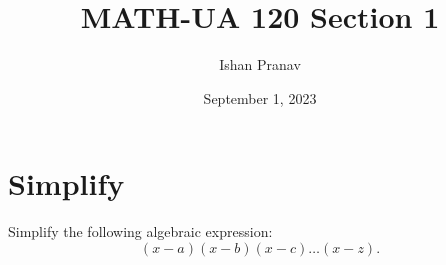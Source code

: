 \documentclass[12pt]{article}
\title{MATH-UA 120 Section 1}
\author{Ishan Pranav}
\date{September 1, 2023}
\begin{document}
\maketitle
\section{Simplify}
Simplify the following algebraic expression:
\[(x-a)(x-b)(x-c)\hdots(x-z).\]
\end{document}
